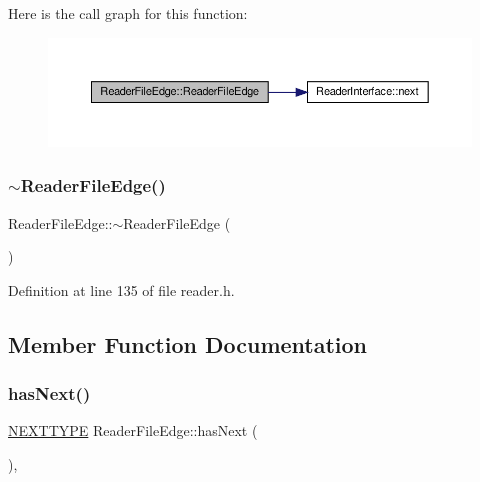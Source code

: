 Here is the call graph for this function\+:\nopagebreak
\begin{figure}[H]
\begin{center}
\leavevmode
\includegraphics[width=350pt]{classReaderFileEdge_a519fd6f5c53a07c2019a36519ca68ea7_cgraph}
\end{center}
\end{figure}
\mbox{\label{classReaderFileEdge_aa4560a4109cd547de863f2efd2eeb779}} 
\subsubsection{\texorpdfstring{$\sim$\+Reader\+File\+Edge()}{~ReaderFileEdge()}}
{\footnotesize\ttfamily Reader\+File\+Edge\+::$\sim$\+Reader\+File\+Edge (\begin{DoxyParamCaption}{ }\end{DoxyParamCaption})\hspace{0.3cm}{\ttfamily [inline]}}



Definition at line 135 of file reader.\+h.



\subsection{Member Function Documentation}
\mbox{\label{classReaderFileEdge_a319f75e4d3ff14a4270e9da8ade89a3b}} 
\subsubsection{\texorpdfstring{has\+Next()}{hasNext()}}
{\footnotesize\ttfamily \hyperlink{classReaderInterface_ac2420ec8d2f60feadf2533d4fa77ec5e}{N\+E\+X\+T\+T\+Y\+PE} Reader\+File\+Edge\+::has\+Next (\begin{DoxyParamCaption}{ }\end{DoxyParamCaption})\hspace{0.3cm}{\ttfamily [inline]}, {\ttfamily [virtual]}}

